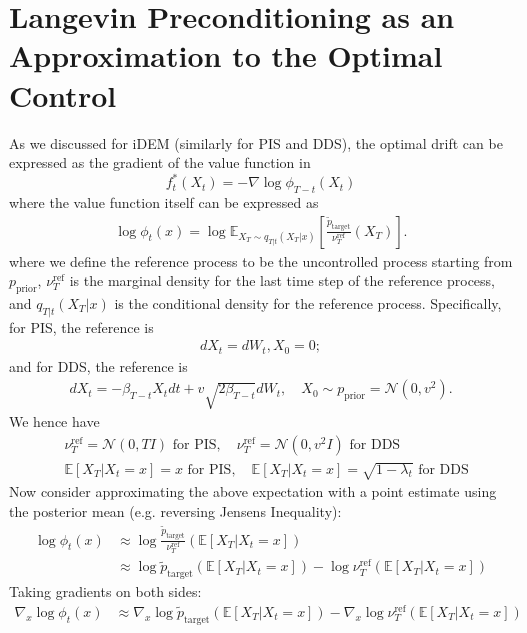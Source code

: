 \documentclass{article} %
\def\ptilde{\tilde{p}_\text{target}}
\begin{document}
\section{Langevin Preconditioning as an Approximation to the Optimal Control}
\label{appendix:langevin_approx}

As we discussed for iDEM (similarly for PIS and DDS), the optimal drift can be expressed as the gradient of the value function in 
$$f^*_{t}(X_t) = - \nabla \log \phi_{T-t}(X_t)$$ 
where the value function itself can be expressed as
\begin{align}
   \log \phi_{t}(x) = \log \mathbb{E}_{X_T \sim q_{T|t}(X_T|x)}\left [\frac{\ptilde}{\nu^{\mathrm{ref}}_T}(X_T)\right].
\end{align}
where we define the reference process to be the uncontrolled process starting from $p_\text{prior}$, $\nu^{\mathrm{ref}}_T$ is the marginal density for the last time step of the reference process, and $q_{T|t}(X_T|x)$ is the conditional density for the reference process.
Specifically, for PIS, the reference is 
\begin{align}
    d X_t = dW_t, X_0 = 0;
\end{align}
and for DDS, the reference is 
\begin{align}
     dX_t = -\beta_{T-t} X_t dt + v \sqrt{2\beta_{T-t}} dW_t, \quad  X_0 \sim p_\text{prior} = \mathcal{N}(0, v^2).
\end{align}
We hence have
\begin{align}
   & \nu^{\mathrm{ref}}_T = \mathcal{N}(0, TI) \text{ for PIS}, \quad  \nu^{\mathrm{ref}}_T = \mathcal{N}(0, v^2I)\text{ for DDS}\\
    &  \mathbb{E}[X_T |X_t=x]  = x \text{ for PIS}, \quad  \mathbb{E}[X_T |X_t=x] = \sqrt{1-\lambda_t} \text{ for DDS}
\end{align}
Now consider approximating the above expectation with a point estimate using the posterior mean (e.g. reversing Jensens Inequality):
\begin{align}
    \log \phi_{t}(x) &\approx   \log  \frac{\ptilde}{\nu^{\mathrm{ref}}_T}(\mathbb{E}[X_T |X_t=x]) \\
    &\approx  \log \ptilde (\mathbb{E}[X_T |X_t=x]) -\log \nu^{\mathrm{ref}}_T (\mathbb{E}[X_T |X_t=x])
\end{align}
Taking gradients on both sides:
\begin{align}
    \nabla_x     \log \phi_{t}(x) &\approx \nabla_x   \log \ptilde (\mathbb{E}[X_T |X_t=x]) - \nabla_x    \log\nu^{\mathrm{ref}}_T (\mathbb{E}[X_T |X_t=x])
\end{align}
\end{document}
